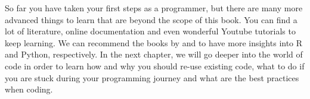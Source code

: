 





So far you have taken your first steps as a programmer, but there are many
more advanced things to learn that are beyond the scope of this
book. You can find a lot of literature, online documentation and even
wonderful Youtube tutorials to keep learning. We can recommend the
books by \cite{crawley2012r} and \cite{vanderplas2016python} to have
more insights into R and Python, respectively. In the next chapter, we
will go deeper into the world of code in order to learn how and why
you should re-use existing code, what to do if you are stuck during your
programming journey and what are the best practices when coding.
